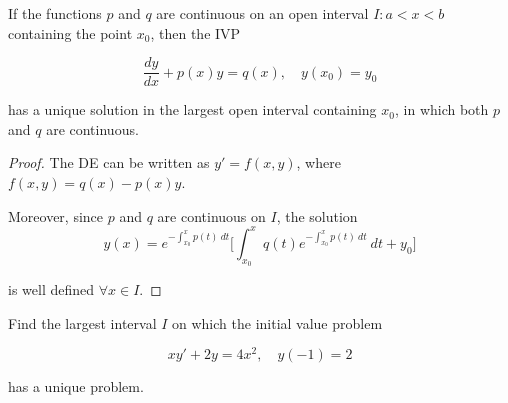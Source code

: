 \begin{theorem}
    If the functions $p$ and $q$ are continuous on an open interval $I: a < x < b$ containing the 
    point $x_0$, then the IVP 

    \begin{equation}
        \frac{dy}{dx} + p(x) y = q(x), \quad y(x_0) = y_0
    \end{equation}

    has a unique solution in the largest open interval containing $x_0$, in which both $p$ and $q$ 
    are continuous.

\end{theorem}
\begin{proof}
    The DE can be written as $y' = f(x,y)$, where $f(x,y) = q(x) - p(x)y$. 

    Moreover, since $p$ and $q$ are continuous on $I$, the solution 
    \begin{equation}
        y(x) = e^{-\int^x_{x_0} p(t)\> dt} \biggl[\int_{x_0}^{x} q(t) e^{-\int^x_{x_0} p(t)\> dt} \> dt + y_0  \biggr]
    \end{equation}

    is well defined $\forall x \in I$.
\end{proof}

\begin{example}
    Find the largest interval $I$ on which the initial value problem

    \[
        xy' + 2y = 4x^2, \quad y(-1) = 2
    \]

    has a unique problem.
\end{example}

